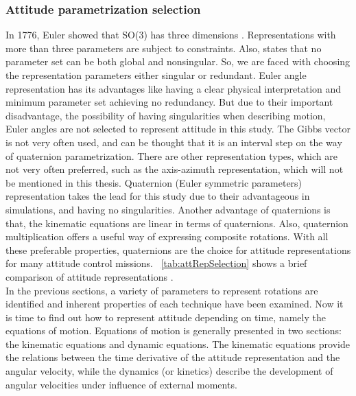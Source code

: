 \subsubsection{Attitude parametrization selection}

In 1776, Euler showed that SO(3) has three dimensions \cite{stuelpnagel1964parametrization}. 
Representations with more than three parameters are subject to constraints. 
Also, \cite{stuelpnagel1964parametrization} states that no parameter set 
can be both global and nonsingular. 
So, we are faced with choosing the representation parameters either singular or redundant. 
Euler angle representation has its advantages like having a clear physical interpretation and minimum parameter set achieving no redundancy. 
But due to their important disadvantage, the possibility of having singularities when describing motion, Euler angles are not selected to represent attitude in this study.
The Gibbs vector is not very often used, and can be thought that it is an interval step on the way of quaternion parametrization. 
There are other representation types, which are not very often 
preferred, such as the axis-azimuth representation, which will not be mentioned  in this thesis. 
Quaternion (Euler symmetric parameters) representation takes the lead for this study due to their advantageous in simulations, and having no singularities.
Another advantage of quaternions is that, the kinematic equations are linear in terms of quaternions. 
Also, quaternion multiplication offers a useful way of expressing composite rotations. 
With all these preferable properties, quaternions are the choice for attitude representations for many attitude control missions. ~\ref{tab:attRepSelection} shows a brief comparison of attitude representations \cite{bak1999spacecraft}.\\
In the previous sections, a variety of parameters to represent rotations are identified and inherent properties of each technique have been examined. 
Now it is time to find out how to represent attitude depending on time, namely the equations of motion. 
Equations of motion is generally presented in two sections: the kinematic equations and dynamic equations. 
The kinematic equations provide the relations between the time derivative of the attitude representation and the angular velocity, while the dynamics (or kinetics) describe the development of angular velocities under influence of external moments.


